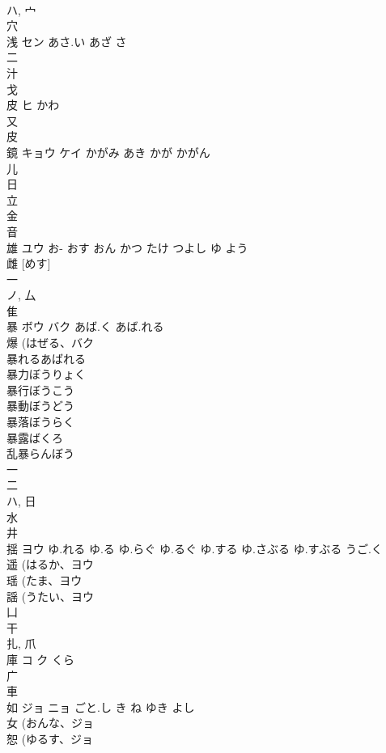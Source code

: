 \documentclass[8pt]{extreport}
\begin{document}
\begin{CJK}{UTF8}{min}
\\	ハ, 宀 
\\	穴 
\\	浅	セン	あさ.い あざ さ	
\\	二 
\\	汁 
\\	戈 
\\	皮	ヒ	かわ	
\\	又 
\\	皮 
\\	鏡	キョウ ケイ	かがみ あき かが かがん	
\\	儿 
\\	日 
\\	立 
\\	金 
\\	音 
\\	雄	ユウ	お- おす おん かつ たけ つよし ゆ よう	
\\	雌 [めす] 
\\	一 
\\	ノ, 厶 
\\	隹 
\\	暴	ボウ バク	あば.く あば.れる	
\\	爆 (はぜる、バク 
\\	暴れるあばれる 
\\	暴力ぼうりょく 
\\	暴行ぼうこう 
\\	暴動ぼうどう 
\\	暴落ぼうらく 
\\	暴露ばくろ 
\\	乱暴らんぼう 
\\	一 
\\	二 
\\	ハ, 日 
\\	水 
\\	井 
\\	揺	ヨウ	ゆ.れる ゆ.る ゆ.らぐ ゆ.るぐ ゆ.する ゆ.さぶる ゆ.すぶる うご.く	
\\	遥 (はるか、ヨウ 
\\	瑶 (たま、ヨウ 
\\	謡 (うたい、ヨウ 
\\	凵 
\\	干 
\\	扎, 爪 
\\	庫	コ ク	くら	
\\	广 
\\	車 
\\	如	ジョ ニョ	ごと.し き ね ゆき よし	
\\	女 (おんな、ジョ 
\\	恕 (ゆるす、ジョ 

\end{CJK}
\end{document}
